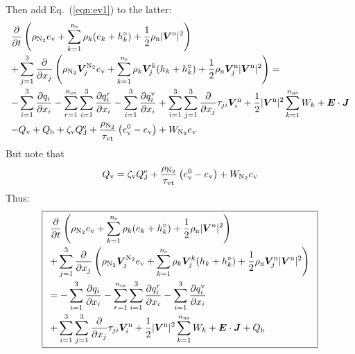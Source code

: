 \documentclass{warpdoc}
\newcommand\frameeqn[1]{\fbox{$\displaystyle #1$}}
\newcommand{\alb}{\vspace{0.1cm}\\} %
\newcommand{\mfd}{\displaystyle}
\newcommand{\ns}{{n_{\rm s}}}
\newcommand{\nns}{{n_{\rm ns}}}
\newcommand{\ncs}{{n_{\rm cs}}}
\newcommand{\ev}{{e_{\rm v}}}
\newcommand{\evzero}{{e_{\rm v}^0}}
\newcommand{\tauvt}{\tau_{\rm vt}}
\renewcommand{\vec}[1]{\bm{#1}}
\begin{document}
%  
Then add Eq.\ (\ref{eqn:ev1}) to the latter:
%
\begin{equation}
\begin{array}{l}\mfd
 \frac{\partial }{\partial t}\left(\rho_{\rm N_2} \ev+\sum_{k=1}^\ns \rho_k (e_k+h_k^\circ)+\frac{1}{2}\rho_{\rm n}|\vec{V}^{\rm n}|^2 \right)\alb\mfd 
+ \sum_{j=1}^3  \frac{\partial }{\partial x_j} \left(\rho_{\rm N_2} \vec{V}_j^{\rm N_2} \ev + \sum_{k=1}^\ns \rho_k \vec{V}^k_j (h_k+h_k^\circ)+\frac{1}{2}\rho_{\rm n}\vec{V}^{\rm n}_j|\vec{V}^{\rm n}|^2 \right)
= \alb\mfd
-\sum_{i=1}^{3}\frac{\partial q_i}{\partial x_i}
- \sum_{r=1}^\ncs \sum_{i=1}^{3}\frac{\partial q_i^r}{\partial x_i}
-\sum_{i=1}^{3}\frac{\partial q_i^{\rm v}}{\partial x_i}
+\sum_{i=1}^3 \sum_{j=1}^3  \frac{\partial }{\partial x_j} \tau_{ji} \vec{V}_i^{\rm n}
+\frac{1}{2}|\vec{V}^{\rm n}|^2 \sum_{k=1}^\nns W_k
+ \vec{E}\cdot\vec{J}
\alb\mfd
-  Q_{\rm v}
+ Q_{\rm b}
+ \zeta_{\rm v} Q_{\rm J}^{\rm e}   
+ {\frac{\rho_{\rm N_2}}{\tauvt}}\left( \evzero-\ev \right) + W_{\rm N_2} \ev
\end{array}
\end{equation}
%  
But note that
%
\begin{equation}
Q_{\rm v}= \zeta_{\rm v}Q_{\rm J}^{\rm e}+ {\frac{\rho_{\rm N_2}}{\tauvt}}\left( \evzero-\ev \right) + W_{\rm N_2} \ev
\end{equation}
%
Thus:
%
\begin{equation}
\frameeqn{
\begin{array}{l}\mfd
 \frac{\partial }{\partial t}\left(\rho_{\rm N_2} \ev+\sum_{k=1}^\ns \rho_k (e_k+h_k^\circ)+\frac{1}{2}\rho_{\rm n}|\vec{V}^{\rm n}|^2 \right) \alb\mfd
+ \sum_{j=1}^3  \frac{\partial }{\partial x_j} \left(\rho_{\rm N_2} \vec{V}_j^{\rm N_2} \ev + \sum_{k=1}^\ns \rho_k \vec{V}^k_j (h_k+h_k^\circ)+\frac{1}{2}\rho_{\rm n}\vec{V}^{\rm n}_j|\vec{V}^{\rm n}|^2 \right)
 \alb\mfd
=
-\sum_{i=1}^{3}\frac{\partial q_i}{\partial x_i}
- \sum_{r=1}^\ncs \sum_{i=1}^{3}\frac{\partial q_i^r}{\partial x_i}
-\sum_{i=1}^{3}\frac{\partial q_i^{\rm v}}{\partial x_i}\alb\mfd
+\sum_{i=1}^3 \sum_{j=1}^3  \frac{\partial }{\partial x_j} \tau_{ji} \vec{V}_i^{\rm n}
+\frac{1}{2}|\vec{V}^{\rm n}|^2 \sum_{k=1}^\nns W_k
+ \vec{E}\cdot\vec{J}
+ Q_{\rm b}
\end{array}
}
\label{eqn:etotal1}
\end{equation}
%  
\end{document}
